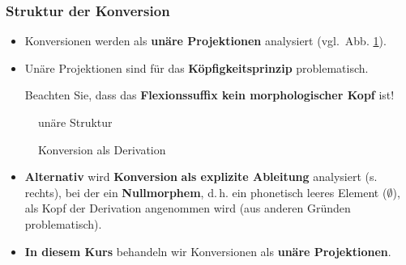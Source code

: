 \begin{frame}
\frametitle{Struktur der Konversion}

\begin{itemize}
\item Konversionen werden als \textbf{unäre Projektionen} analysiert (vgl.\ Abb. \ref{fig:5cKonUnary}). 

\item Unäre Projektionen sind für das \textbf{Köpfigkeitsprinzip} problematisch.

Beachten Sie, dass das \textbf{Flexionssuffix kein morphologischer Kopf} ist!

\end{itemize}

\begin{minipage}{.49\textwidth}

\begin{figure}	
\centering
{}
\caption{unäre Struktur}
\label{fig:5cKonUnary}
\end{figure}

\end{minipage}
%
\hfill %
\pause %
%
\begin{minipage}{.49\textwidth}

\begin{figure}	
\centering
{}
\caption{Konversion als Derivation}
\label{fig:5cKonDer}
\end{figure}

\end{minipage}	

\begin{itemize}
\item<2-> \textbf{Alternativ} wird \textbf{Konversion} \textbf{als explizite Ableitung} analysiert (s. rechts), bei der ein \textbf{Nullmorphem}, d.\,h. ein phonetisch leeres Element ($\emptyset$), als Kopf der Derivation angenommen wird (aus anderen Gründen problematisch). 

\item<2-> \textbf{In diesem Kurs} behandeln wir Konversionen als \textbf{unäre Projektionen}.
\end{itemize}

\end{frame}


